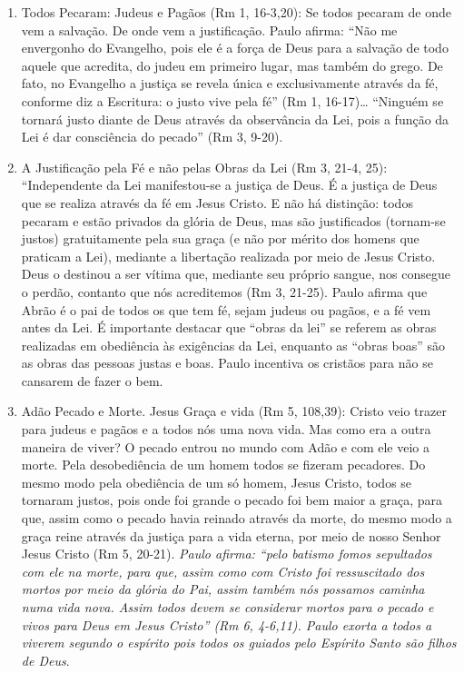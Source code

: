 \documentclass[
]{book}
\begin{document}
\begin{enumerate}
\def\labelenumi{\arabic{enumi}.}
\item
  Todos Pecaram: Judeus e Pagãos (Rm 1, 16-3,20): Se todos pecaram de onde vem a salvação. De onde vem a justificação. Paulo afirma: ``Não me envergonho do Evangelho, pois ele é a força de Deus para a salvação de todo aquele que acredita, do judeu em primeiro lugar, mas também do grego. De fato, no Evangelho a justiça se revela única e exclusivamente através da fé, conforme diz a Escritura: o justo vive pela fé'' (Rm 1, 16-17)\ldots{} ``Ninguém se tornará justo diante de Deus através da observância da Lei, pois a função da Lei é dar consciência do pecado'' (Rm 3, 9-20).
\item
  A Justificação pela Fé e não pelas Obras da Lei (Rm 3, 21-4, 25): ``Independente da Lei manifestou-se a justiça de Deus. É a justiça de Deus que se realiza através da fé em Jesus Cristo. E não há distinção: todos pecaram e estão privados da glória de Deus, mas são justificados (tornam-se justos) gratuitamente pela sua graça (e não por mérito dos homens que praticam a Lei), mediante a libertação realizada por meio de Jesus Cristo. Deus o destinou a ser vítima que, mediante seu próprio sangue, nos consegue o perdão, contanto que nós acreditemos (Rm 3, 21-25). Paulo afirma que Abrão é o pai de todos os que tem fé, sejam judeus ou pagãos, e a fé vem antes da Lei. É importante destacar que ``obras da lei'' se referem as obras realizadas em obediência às exigências da Lei, enquanto as ``obras boas'' são as obras das pessoas justas e boas. Paulo incentiva os cristãos para não se cansarem de fazer o bem.
\item
  Adão Pecado e Morte. Jesus Graça e vida (Rm 5, 108,39): Cristo veio trazer para judeus e pagãos e a todos nós uma nova vida. Mas como era a outra maneira de viver? O pecado entrou no mundo com Adão e com ele veio a morte. Pela desobediência de um homem todos se fizeram pecadores. Do mesmo modo pela obediência de um só homem, Jesus Cristo, todos se tornaram justos, pois onde foi grande o pecado foi bem maior a graça, para que, assim como o pecado havia reinado através da morte, do mesmo modo a graça reine através da justiça para a vida eterna, por meio de nosso Senhor Jesus Cristo (Rm 5, 20-21). \emph{Paulo afirma: ``pelo batismo fomos sepultados com ele na morte, para que, assim como com Cristo foi ressuscitado dos mortos por meio da glória do Pai, assim também nós possamos caminha numa vida nova. Assim todos devem se considerar mortos para o pecado e vivos para Deus em Jesus Cristo'' (Rm 6, 4-6,11). Paulo exorta a todos a viverem segundo o espírito pois todos os guiados pelo Espírito Santo são filhos de Deus}.

\end{enumerate}
\end{document}
